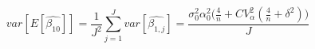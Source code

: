 \begin{equation}
\label{avgvar}
var[E[\hat{\beta_{10}}]] = \frac{1}{J^2}\sum\limits_{j=1}^{J}{var[\hat{\beta_{1,j}}]} = \frac{\sigma_0^2\alpha_0^2\Big(\frac{4}{n} + CV_{\alpha}^2(\frac{4}{n} + \delta^2)\Big)}{J}
\end{equation}